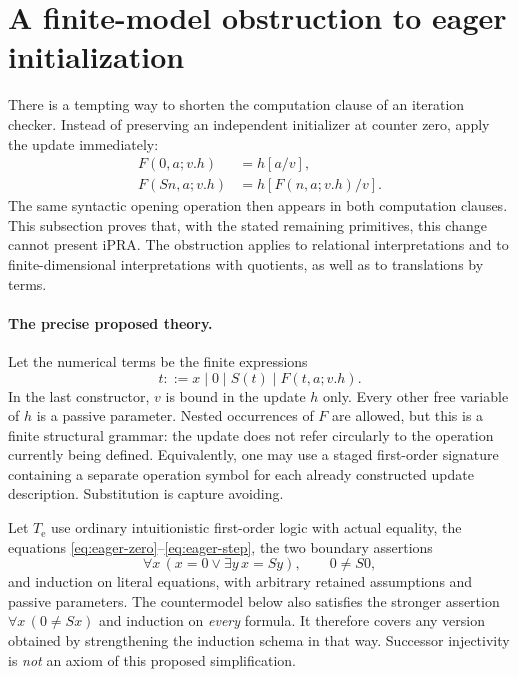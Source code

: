 
\section{A finite-model obstruction to eager initialization}
\label{sec:eager-obstruction}

There is a tempting way to shorten the computation clause of an iteration
checker.  Instead of preserving an independent initializer at counter zero,
apply the update immediately:
\begin{align}
 F(0,a;v.h)&=h[a/v],\label{eq:eager-zero}\\
 F(Sn,a;v.h)&=h[F(n,a;v.h)/v].\label{eq:eager-step}
\end{align}
The same syntactic opening operation then appears in both computation
clauses.  This subsection proves that, with the stated remaining
primitives, this change cannot present iPRA.  The obstruction applies to
relational interpretations and to finite-dimensional interpretations with
quotients, as well as to translations by terms.

\paragraph{The precise proposed theory.}
Let the numerical terms be the finite expressions
\[
 t ::= x\mid 0\mid S(t)\mid F(t,a;v.h).
\]
In the last constructor, $v$ is bound in the update $h$ only.  Every other
free variable of $h$ is a passive parameter.  Nested occurrences of $F$
are allowed, but this is a finite structural grammar: the update does not
refer circularly to the operation currently being defined.  Equivalently,
one may use a staged first-order signature containing a separate operation
symbol for each already constructed update description.  Substitution is
capture avoiding.

Let $T_{\mathrm e}$ use ordinary intuitionistic first-order logic with
actual equality, the equations \eqref{eq:eager-zero}--\eqref{eq:eager-step},
the two boundary assertions
\[
 \forall x\,(x=0\vee\exists y\,x=Sy),\qquad 0\ne S0,
\]
and induction on literal equations, with arbitrary retained assumptions
and passive parameters.  The countermodel below also satisfies the
stronger assertion $\forall x\,(0\ne Sx)$ and induction on \emph{every}
formula.  It therefore covers any version obtained by strengthening the
induction schema in that way.  Successor injectivity is \emph{not} an
axiom of this proposed simplification.

